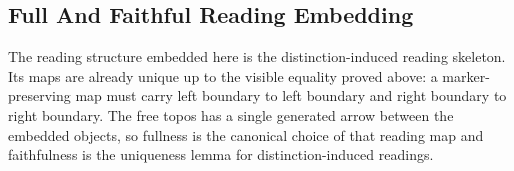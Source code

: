 \documentclass[11pt]{article}
\begin{document}
\begin{code}
\>[0][@{}l@{\AgdaIndent{0}}]%
\>[2]\AgdaSymbol{\{}\AgdaSpace{}%
%
\>[27]\AgdaSymbol{=}\AgdaSpace{}%
\<%
\\
%
\>[2]\AgdaSymbol{;}\AgdaSpace{}%
%
\>[27]\AgdaSymbol{=}\AgdaSpace{}%
\<%
\\
%
\>[2]\AgdaSymbol{;}\AgdaSpace{}%
%
\>[27]\AgdaSymbol{=}\AgdaSpace{}%
\<%
\\
%
\>[2]\AgdaSymbol{;}\AgdaSpace{}%
%
\>[27]\AgdaSymbol{=}\AgdaSpace{}%
\AgdaSpace{}%
\AgdaSpace{}%
\AgdaSpace{}%
\<%
\\
%
\>[2]\AgdaSymbol{;}\AgdaSpace{}%
\AgdaSpace{}%
\AgdaSymbol{=}\AgdaSpace{}%
\AgdaSpace{}%
\AgdaSpace{}%
\AgdaSpace{}%
\<%
\\
%
\>[2]\AgdaSymbol{;}\AgdaSpace{}%
\AgdaSpace{}%
\AgdaSymbol{=}\AgdaSpace{}%
\AgdaSpace{}%
\AgdaSpace{}%
\AgdaSpace{}%
\<%
\\
%
\>[2]\AgdaSymbol{;}\AgdaSpace{}%
%
\>[27]\AgdaSymbol{=}\AgdaSpace{}%
\<%
\\
%
\>[2]\AgdaSymbol{;}\AgdaSpace{}%
%
\>[27]\AgdaSymbol{=}\AgdaSpace{}%
\<%
\\
%
\>[2]\AgdaSymbol{;}\AgdaSpace{}%
%
\>[27]\AgdaSymbol{=}\AgdaSpace{}%
\<%
\\
%
\>[2]\AgdaSymbol{;}\AgdaSpace{}%
%
\>[27]\AgdaSymbol{=}\AgdaSpace{}%
\<%
\\
%
\>[2]\AgdaSymbol{\}}\<%
\end{code}

\subsection{Full And Faithful Reading Embedding}

The reading structure embedded here is the distinction-induced reading
skeleton.  Its maps are already unique up to the visible equality proved
above: a marker-preserving map must carry left boundary to left boundary
and right boundary to right boundary.  The free topos has a single
generated arrow between the embedded objects, so fullness is the canonical
choice of that reading map and faithfulness is the uniqueness lemma for
distinction-induced readings.
\end{document}
